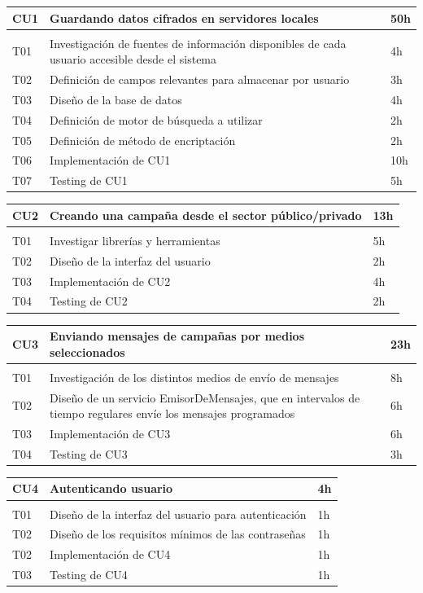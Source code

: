 \documentclass[a4paper, 10pt, twoside]{article}
\begin{document}
\begin{tabular}{lp{13cm}l}
  \hline
  CU1 & Guardando datos cifrados en servidores locales & 50h \\
  \hline \\
  T01 & Investigación de fuentes de información disponibles de cada usuario accesible desde el sistema & 4h \\
  T02 & Definición de campos relevantes para almacenar por usuario & 3h \\
  T03 & Diseño de la base de datos & 4h \\
  T04 & Definición de motor de búsqueda a utilizar & 2h \\
  T05 & Definición de método de encriptación & 2h \\
  T06 & Implementación de CU1 & 10h\\
  T07 & Testing de CU1 & 5h \\
  \hline
\end{tabular}

\begin{tabular}{lp{13cm}l}
  \hline
  CU2 & Creando una campaña desde el sector público/privado & 13h \\
  \hline \\
  T01 & Investigar librerías y herramientas  & 5h \\
  T02 & Diseño de la interfaz del usuario & 2h \\
  T03 & Implementación de CU2 & 4h \\
  T04 & Testing de CU2 & 2h \\
  \hline
\end{tabular}

\begin{tabular}{lp{13cm}l}
  \hline
  CU3 &  Enviando mensajes de campañas por medios seleccionados & 23h \\
  \hline \\
  T01 & Investigación de los distintos medios de envío de mensajes & 8h \\
  T02 & Diseño de un servicio EmisorDeMensajes, que en intervalos de tiempo regulares envíe los mensajes programados & 6h \\
  T03 & Implementación de CU3 & 6h \\
  T04 & Testing de CU3 & 3h \\
  \hline
\end{tabular}

\begin{tabular}{lp{13cm}l}
  \hline
  CU4 & Autenticando usuario & 4h \\
  \hline \\
  T01 & Diseño de la interfaz del usuario para autenticación & 1h \\
  T02 & Diseño de los requisitos mínimos de las contraseñas & 1h \\
  T02 & Implementación de CU4 & 1h \\
  T03 & Testing de CU4 & 1h \\
  \hline
\end{tabular}
\end{document}
